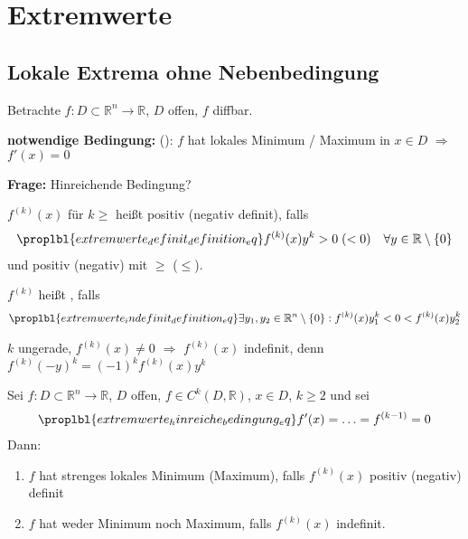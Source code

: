 \section{Extremwerte} \setcounter{equation}{0}
\subsection{Lokale Extrema ohne Nebenbedingung}
Betrachte $f:D\subset\mathbb{R}^n\to\mathbb{R}$, $D$ offen, $f$ \gls{diffbar}.

\textbf{notwendige Bedingung:} (): $f$ hat lokales Minimum / Maximum in $x\in D$ $\Rightarrow$ $f'(x) = 0$

\textbf{Frage:} Hinreichende Bedingung?

\begin{*definition}
	$f^{(k)}(x)$ für $k\ge $ heißt positiv  (negativ definit), falls \begin{align}
		\proplbl{extremwerte_definit_definition_eq}
		f^{(k)}(x) y^k > 0 \;(< 0) \quad\forall y\in\mathbb{R}\setminus \{0\}
	\end{align}
	und positiv (negativ)  mit $\ge$ ($\le$).
	
	$f^{(k)}$ heißt , falls \begin{align}
		\proplbl{extremwerte_indefinit_definition_eq}
		\exists y_1, y_2\in\mathbb{R}^n\setminus \{0\}: f^{(k)}(x) y_1^k < 0 < f^{(k)} (x) y_2^k
	\end{align}
\end{*definition}

\begin{underlinedenvironment}[Hinweis]
	$k$ ungerade, $f^{(k)}(x)\neq 0$ $\Rightarrow$ $f^{(k)}(x)$ indefinit, denn $f^{(k)}(-y)^k = (-1)^k f^{(k)}(x) y^k$
\end{underlinedenvironment}

\begin{proposition}
	Sei $f:D\subset\mathbb{R}^n\to\mathbb{R}$, $D$ offen, $f\in C^k(D,\mathbb{R})$, $x\in D$, $k\ge 2$ und sei \begin{align}
		\proplbl{extremwerte_hinreiche_bedingung_eq}
		f'(x) = \dotsc = f^{(k-1)} = 0
	\end{align}
	Dann: \begin{enumerate}[label={\alph*)}]
		\item $f$ hat strenges lokales Minimum (Maximum), falls $f^{(k)}(x)$ positiv (negativ) definit
		\item {}
		$f$ hat weder Minimum noch Maximum, falls $f^{(k)}(x)$ indefinit.
	\end{enumerate}
\end{proposition}

